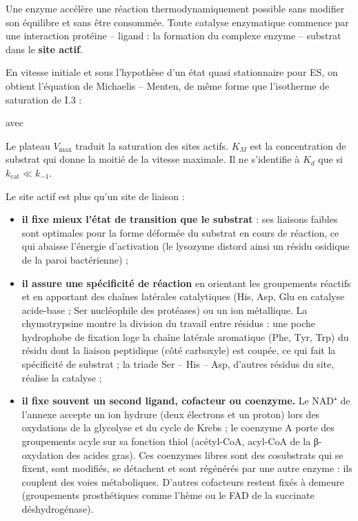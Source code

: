 \documentclass[11pt,a4paper]{article}
\providecommand{\tightlist}{\setlength{\itemsep}{0pt}\setlength{\parskip}{0pt}}
\newcommand{\equationajustee}[1]{%
  \sbox{\boiteequation}{$\displaystyle #1$}%
  \ifdim\wd\boiteequation>\linewidth
    \[\resizebox{\linewidth}{!}{\usebox{\boiteequation}}\]%
  \else
    \[#1\]%
  \fi}
\begin{document}
Une enzyme accélère une réaction thermodynamiquement possible sans modifier son équilibre et sans être consommée. Toute catalyse enzymatique commence par une interaction protéine -- ligand : la formation du complexe enzyme -- substrat dans le \textbf{site actif}.

\equationajustee{\mathrm{E} + \mathrm{S} \;\underset{k_{-1}}{\overset{k_{1}}{\rightleftharpoons}}\; \mathrm{ES} \;\xrightarrow{\;k_{\mathrm{cat}}\;}\; \mathrm{E} + \mathrm{P}}

En vitesse initiale et sous l'hypothèse d'un état quasi stationnaire pour ES, on obtient l'équation de Michaelis -- Menten, de même forme que l'isotherme de saturation de I.3 :

\equationajustee{\boxed{v_0 = \frac{V_{\max}\,[\mathrm{S}]}{K_M + [\mathrm{S}]}}}

avec

\equationajustee{\begin{aligned}
K_M &= \frac{k_{-1} + k_{\mathrm{cat}}}{k_1} \\
V_{\max} &= k_{\mathrm{cat}}\,[\mathrm{E}]_{\mathrm{tot}}
\end{aligned}}

Le plateau \(V_{\max}\) traduit la saturation des sites actifs. \(K_M\) est la concentration de substrat qui donne la moitié de la vitesse maximale. Il ne s'identifie à \(K_d\) que si \(k_{\mathrm{cat}} \ll k_{-1}\).

Le site actif est plus qu'un site de liaison :

\begin{itemize}
\tightlist
\item
  \textbf{il fixe mieux l'état de transition que le substrat} : ses liaisons faibles sont optimales pour la forme déformée du substrat en cours de réaction, ce qui abaisse l'énergie d'activation (le lysozyme distord ainsi un résidu osidique de la paroi bactérienne) ;
\item
  \textbf{il assure une spécificité de réaction} en orientant les groupements réactifs et en apportant des chaînes latérales catalytiques (His, Asp, Glu en catalyse acide-base ; Ser nucléophile des protéases) ou un ion métallique. La chymotrypsine montre la division du travail entre résidus : une poche hydrophobe de fixation loge la chaîne latérale aromatique (Phe, Tyr, Trp) du résidu dont la liaison peptidique (côté carboxyle) est coupée, ce qui fait la spécificité de substrat ; la triade Ser -- His -- Asp, d'autres résidus du site, réalise la catalyse ;
\item
  \textbf{il fixe souvent un second ligand, cofacteur ou coenzyme.} Le NAD⁺ de l'annexe accepte un ion hydrure (deux électrons et un proton) lors des oxydations de la glycolyse et du cycle de Krebs ; le coenzyme A porte des groupements acyle sur sa fonction thiol (acétyl-CoA, acyl-CoA de la β-oxydation des acides gras). Ces coenzymes libres sont des cosubstrats qui se fixent, sont modifiés, se détachent et sont régénérés par une autre enzyme : ils couplent des voies métaboliques. D'autres cofacteurs restent fixés à demeure (groupements prosthétiques comme l'hème ou le FAD de la succinate déshydrogénase).
\end{itemize}
\end{document}
